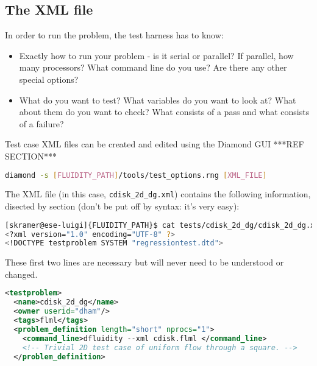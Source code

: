 \subsection{The XML file}

In order to run the problem, the test harness has to know:
\begin{itemize}
\item Exactly how to run your problem - is it serial or parallel? If parallel, how many processors? What command line do you use? Are there any other special options? 
\item What do you want to test? What variables do you want to look at? What about them do you want to check? What consists of a pass and what consists of a failure? 
\end{itemize}

Test case XML files can be created and edited using the Diamond GUI ***REF SECTION*** 

\begin{example}
\begin{lstlisting}[language=bash]
diamond -s [FLUIDITY_PATH]/tools/test_options.rng [XML_FILE]
\end{lstlisting}
\end{example}

The XML file (in this case, \lstinline[language=bash]+cdisk_2d_dg.xml+) contains the following information, disected by section (don't be put off by syntax: it's very easy):
\begin{example}
\begin{lstlisting}[language=bash]
[skramer@ese-luigi]{FLUIDITY_PATH}$ cat tests/cdisk_2d_dg/cdisk_2d_dg.xml
<?xml version="1.0" encoding="UTF-8" ?> 
<!DOCTYPE testproblem SYSTEM "regressiontest.dtd"> 
\end{lstlisting}
\end{example}

These first two lines are necessary but will never need to be understood or changed.
\begin{example}
\begin{lstlisting}[language=xml]
<testproblem> 
  <name>cdisk_2d_dg</name>
  <owner userid="dham"/>
  <tags>flml</tags>
  <problem_definition length="short" nprocs="1">
    <command_line>dfluidity --xml cdisk.flml </command_line>
    <!-- Trivial 2D test case of uniform flow through a square. -->
  </problem_definition>
\end{lstlisting} 
\end{example}

